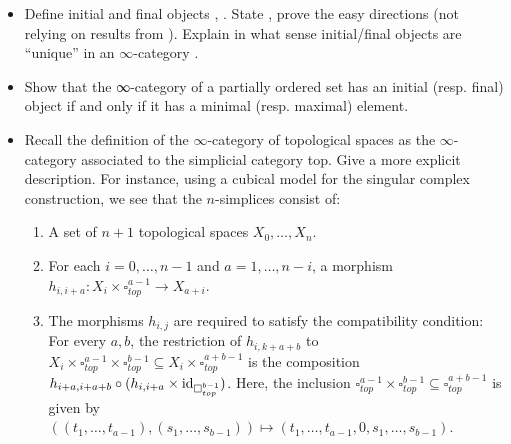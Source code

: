 \documentclass{amsart}
\theoremstyle{definition}
\theoremstyle{remark}
\newcommand{\id}{{\rm id}}
\begin{document}
\begin{itemize}
\item Define initial and final objects \cite[§2.4]{Groth}, \cite[§1.2.12.3]{HTT}. State \cite[Prop. 1.2.12.4, Cor. 1.2.12.5]{HTT}, prove the easy directions (not relying on results from \cite[\S 2]{HTT}). Explain in what sense initial/final objects are \enquote{unique} in an $\infty$-category \cite[Prop. 1.2.12.9]{HTT}.
\item Show that the ∞-category of a partially ordered set has an initial (resp. final) object if and only if it has a minimal (resp. maximal) element.
\item Recall the definition of the $\infty$-category of topological spaces as the $\infty$-category associated to the simplicial category top. Give a more explicit description. For instance, using a cubical model for the singular complex construction, we see that the $n$-simplices consist of:
\begin{enumerate}
 \item A set of $n{+}1$ topological spaces $X_0, \dots, X_n$.

 \item For each $i = 0, \dots, n{-}1$ and $a = 1, \dots, n{-}i$, a morphism $h_{i,i{+}a}: X_i {\times} \square^{a{-}1}_{top} \to X_{a{+}i}$.%

 \item The morphisms $h_{i,j}$ are required to satisfy the compatibility condition: For every $a, b$, the restriction of $h_{i,k{+}a{+}b}$ to $X_i{\times}\square^{a{-}1}_{top} {\times} \square^{b{-}1}_{top} \subseteq X_{i}{\times}\square^{a{+}b{-}1}_{top}$ is the composition $h_{i{+}a,i{+}a{+}b} \circ (h_{i,i{+}a} \times \id_{\square^{b{-}1}_{top}})$. Here, the inclusion $\square^{a{-}1}_{top} {\times} \square^{b{-}1}_{top} \subseteq \square^{a{+}b{-}1}_{top}$ is given by $((t_1, \dots, t_{a-1}), (s_1, \dots, s_{b-1})) \mapsto (t_1, \dots, t_{a-1}, 0, s_1, \dots, s_{b-1})$.
\end{enumerate}


\end{itemize}
\end{document}
